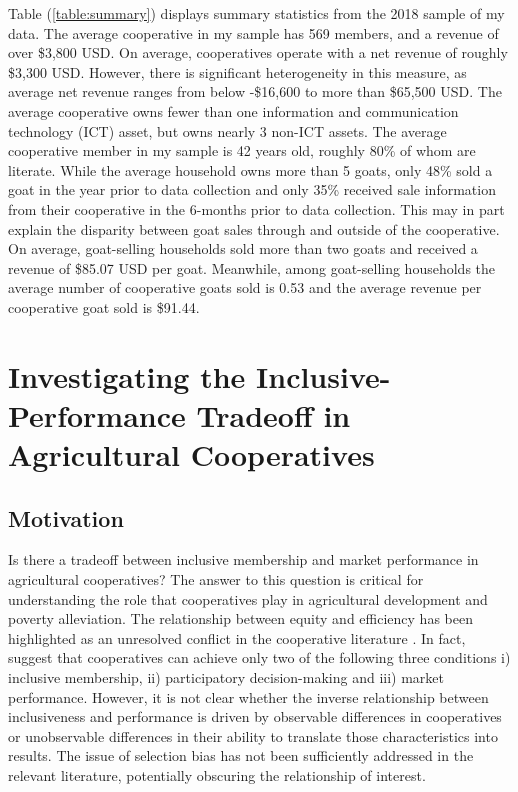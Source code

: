 \documentclass[11pt]{article}
\begin{document}
Table (\ref{table:summary}) displays summary statistics from the 2018 sample of my data. The average cooperative in my sample has 569 members, and a revenue of over \$3,800 USD. On average, cooperatives operate with a net revenue of roughly \$3,300 USD. However, there is significant heterogeneity in this measure, as average net revenue ranges from below -\$16,600 to more than \$65,500 USD. The average cooperative owns fewer than one information and communication technology (ICT) asset, but owns nearly 3 non-ICT assets. The average cooperative member in my sample is 42 years old, roughly 80\% of whom are literate. While the average household owns more than 5 goats, only 48\% sold a goat in the year prior to data collection and only 35\% received sale information from their cooperative in the 6-months prior to data collection. This may in part explain the disparity between goat sales through and outside of the cooperative. On average, goat-selling households sold more than two goats and received a revenue of \$85.07 USD per goat. Meanwhile, among goat-selling households the average number of cooperative goats sold is 0.53 and the average revenue per cooperative goat sold is \$91.44.


\newpage
\singlespacing

\section{Investigating the Inclusive-Performance Tradeoff in Agricultural Cooperatives} \label{sec:E1}
\doublespacing


\subsection{Motivation} \label{sec:E1_motivation}

Is there a tradeoff between inclusive membership and market performance in agricultural cooperatives? The answer to this question is critical for understanding the role that cooperatives play in agricultural development and poverty alleviation. 
The relationship between equity and efficiency has been highlighted as an unresolved conflict in the cooperative literature \citep{worldbank08}. In fact, \citet{bernard-spielman09} suggest that cooperatives can achieve only two of the following three conditions i) inclusive membership, ii) participatory decision-making and iii) market performance. However, it is not clear whether the inverse relationship between inclusiveness and performance is driven by observable differences in cooperatives or unobservable differences in their ability to translate those characteristics into results. The issue of selection bias has not been sufficiently addressed in the relevant literature, potentially obscuring the relationship of interest. 
\end{document}
